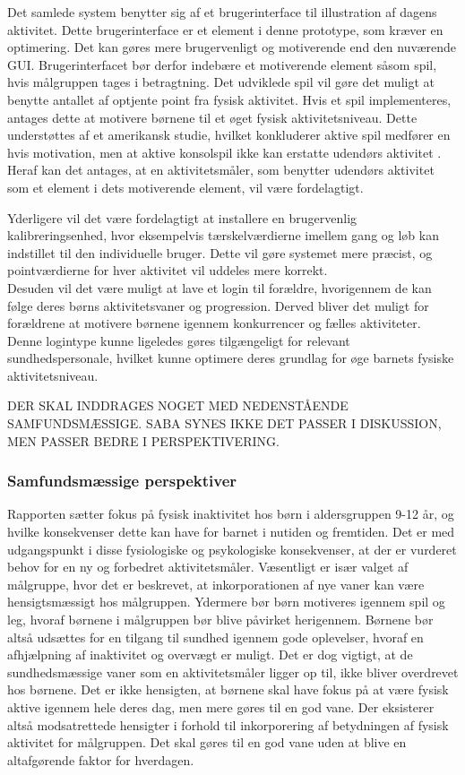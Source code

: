 Det samlede system benytter sig af et brugerinterface til illustration af dagens aktivitet. Dette brugerinterface er et element i denne prototype, som kræver en optimering. Det kan gøres mere brugervenligt og motiverende end den nuværende GUI. Brugerinterfacet bør derfor indebære et motiverende element såsom spil, hvis målgruppen tages i betragtning. Det udviklede spil vil gøre det muligt at benytte antallet af optjente point fra fysisk aktivitet. Hvis et spil implementeres, antages dette at motivere børnene til et øget fysisk aktivitetsniveau. Dette understøttes af et amerikansk studie, hvilket konkluderer aktive spil medfører en hvis motivation, men at aktive konsolspil ikke kan erstatte udendørs aktivitet \citep{Oestergaard2012}. Heraf kan det antages, at en aktivitetsmåler, som benytter udendørs aktivitet som et element i dets motiverende element, vil være fordelagtigt.

Yderligere vil det være fordelagtigt at installere en brugervenlig kalibreringsenhed, hvor eksempelvis tærskelværdierne imellem gang og løb kan indstillet til den individuelle bruger. Dette vil gøre systemet mere præcist, og pointværdierne for hver aktivitet vil uddeles mere korrekt. \\
Desuden vil det være muligt at lave et login til forældre, hvorigennem de kan følge deres børns aktivitetsvaner og progression. Derved bliver det muligt for forældrene at motivere børnene igennem konkurrencer og fælles aktiviteter. Denne logintype kunne ligeledes gøres tilgængeligt for relevant sundhedspersonale, hvilket kunne optimere deres grundlag for øge barnets fysiske aktivitetsniveau.

DER SKAL INDDRAGES NOGET MED NEDENSTÅENDE SAMFUNDSMÆSSIGE. SABA SYNES IKKE DET PASSER I DISKUSSION, MEN PASSER BEDRE I PERSPEKTIVERING. 
\subsubsection{Samfundsmæssige perspektiver}
Rapporten sætter fokus på fysisk inaktivitet hos børn i aldersgruppen 9-12 år, og hvilke konsekvenser dette kan have for barnet i nutiden og fremtiden. Det er med udgangspunkt i disse fysiologiske og psykologiske konsekvenser, at der er vurderet behov for en ny og forbedret aktivitetsmåler. Væsentligt er især valget af målgruppe, hvor det er beskrevet, at inkorporationen af nye vaner kan være hensigtsmæssigt hos målgruppen. Ydermere bør børn motiveres igennem spil og leg, hvoraf børnene i målgruppen bør blive påvirket herigennem. Børnene bør altså udsættes for en tilgang til sundhed igennem gode oplevelser, hvoraf en afhjælpning af inaktivitet og overvægt er muligt. Det er dog vigtigt, at de sundhedsmæssige vaner som en aktivitetsmåler ligger op til, ikke bliver overdrevet hos børnene. Det er ikke hensigten, at børnene skal have fokus på at være fysisk aktive igennem hele deres dag, men mere gøres til en god vane. Der eksisterer altså modsatrettede hensigter i forhold til inkorporering af betydningen af fysisk aktivitet for målgruppen. Det skal gøres til en god vane uden at blive en altafgørende faktor for hverdagen.